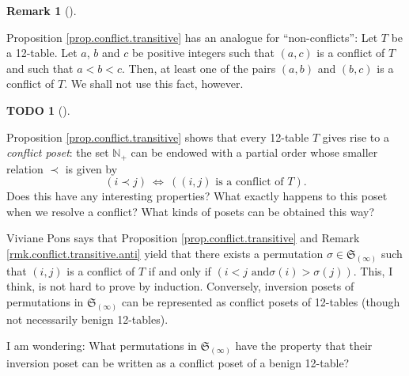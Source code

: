 \documentclass[numbers=enddot,12pt,final,onecolumn,notitlepage]{scrartcl}%
\theoremstyle{definition}
\newtheorem{remk}[theo]{Remark}
\newenvironment{remark}[1][]
{\begin{remk}[#1]\begin{leftbar}}
{\end{leftbar}\end{remk}}
\newtheorem{quest}[theo]{TODO}
\newenvironment{todo}[1][]
{\begin{quest}[#1]\begin{leftbar}}
{\end{leftbar}\end{quest}}
\begin{document}
\begin{remark}
\label{rmk.conflict.transitive.anti}Proposition \ref{prop.conflict.transitive}
has an analogue for \textquotedblleft non-conflicts\textquotedblright: Let $T$
be a 12-table. Let $a$, $b$ and $c$ be positive integers such that $\left(
a,c\right)  $ is a conflict of $T$ and such that $a<b<c$. Then, at least one
of the pairs $\left(  a,b\right)  $ and $\left(  b,c\right)  $ is a conflict
of $T$. We shall not use this fact, however.
\end{remark}

\begin{todo}
Proposition \ref{prop.conflict.transitive} shows that every 12-table $T$ gives
rise to a \textit{conflict poset}: the set $\mathbb{N}_{+}$ can be endowed
with a partial order whose smaller relation $\prec$ is given by%
\[
\left(  i\prec j\right)  \ \Longleftrightarrow\ \left(  \left(  i,j\right)
\text{ is a conflict of }T\right)  .
\]
Does this have any interesting properties? What exactly happens to this poset
when we resolve a conflict? What kinds of posets can be obtained this way?

Viviane Pons says that Proposition \ref{prop.conflict.transitive} and Remark
\ref{rmk.conflict.transitive.anti} yield that there exists a permutation
$\sigma\in\mathfrak{S}_{\left(  \infty\right)  }$ such that $\left(
i,j\right)  $ is a conflict of $T$ if and only if $\left(  i<j\text{ and
}\sigma\left(  i\right)  >\sigma\left(  j\right)  \right)  $. This, I think,
is not hard to prove by induction. Conversely, inversion posets of
permutations in $\mathfrak{S}_{\left(  \infty\right)  }$ can be represented as
conflict posets of 12-tables (though not necessarily benign 12-tables).

I am wondering: What permutations in $\mathfrak{S}_{\left(  \infty\right)  }$
have the property that their inversion poset can be written as a conflict
poset of a benign 12-table?
\end{todo}
\end{document}

